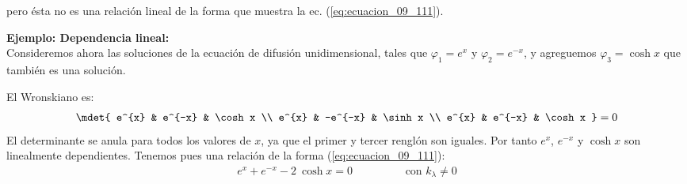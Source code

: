 pero ésta no es una relación lineal de la forma que muestra la ec. (\ref{eq:ecuacion_09_111}).
\par
\textbf{Ejemplo: Dependencia lineal:}
\\
Consideremos ahora las soluciones de la ecuación de difusión unidimensional, tales que $\varphi_{1} = e^{x}$ y $\varphi_{2} = e^{-x}$, y agreguemos $\varphi_{3} = \cosh x$ que también es una solución. 
\par
El Wronskiano es:
\begin{align*}
\mdet{
e^{x}  & e^{-x} & \cosh x \\
e^{x}  & -e^{-x} & \sinh x \\
e^{x}  & e^{-x} & \cosh x
} = 0
\end{align*}
El determinante se anula para todos los valores de $x$, ya que el primer y tercer renglón son iguales. Por tanto $e^{x}$, $e^{-x}$ y $\cosh x$ son linealmente dependientes. Tenemos pues una relación de la forma (\ref{eq:ecuacion_09_111}):
\begin{align*}
e^{x} + e^{-x} - 2 \: \cosh x = 0 \hspace{2cm} \text{con } k_{\lambda} \neq 0
\end{align*}
